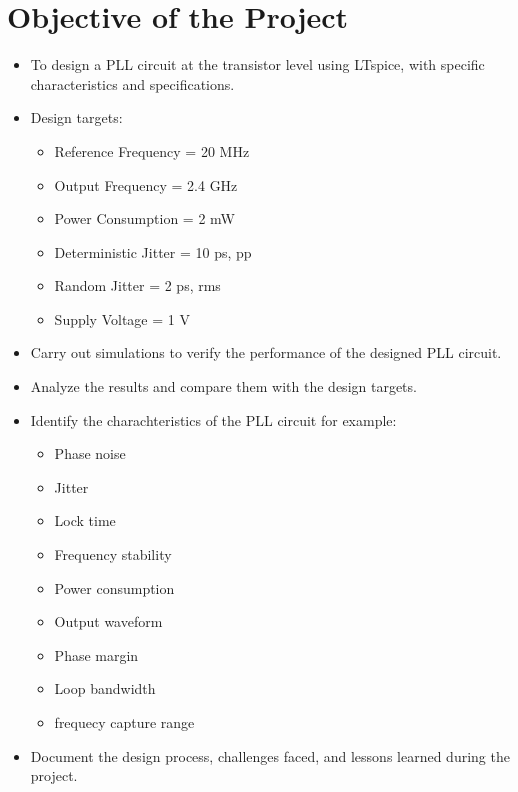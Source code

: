 \section{Objective of the Project}
\begin{itemize}
    \item To design a PLL circuit at the transistor level using LTspice, with specific characteristics and specifications.
    \item Design targets:
    \begin{itemize}
        \item Reference Frequency = 20 MHz
        \item Output Frequency = 2.4 GHz
        \item Power Consumption = 2 mW
        \item Deterministic Jitter = 10 ps, pp
        \item Random Jitter = 2 ps, rms
        \item Supply Voltage = 1 V
    \end{itemize}
    \item Carry out simulations to verify the performance of the designed PLL circuit.
    \item Analyze the results and compare them with the design targets.
    \item Identify the charachteristics of the PLL circuit for example:
    \begin{itemize}
        \item Phase noise
        \item Jitter
        \item Lock time
        \item Frequency stability
        \item Power consumption
        \item Output waveform
        \item Phase margin
        \item Loop bandwidth
        \item frequecy capture range
    \end{itemize}       
    \item Document the design process, challenges faced, and lessons learned during the project.
\end{itemize}